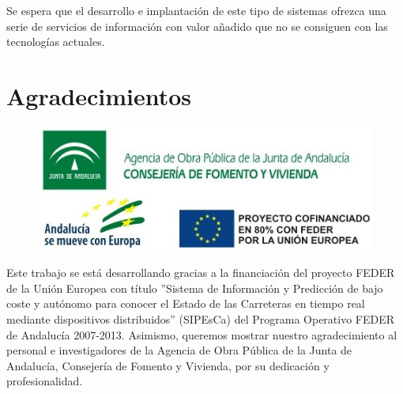 \documentclass[twocolumn,twoside]{Jornadas}
\begin{document}
Se espera que el desarrollo e implantación de este tipo de sistemas ofrezca una serie de servicios de información con valor añadido que no se consiguen con las tecnologías actuales.


\bigskip

\section*{Agradecimientos}

\begin{figure}[H]
\begin{center} 
 \includegraphics[scale=0.7]{logos_SIPESCA_2.jpg}
\end{center} 
\end{figure}

Este trabajo se está desarrollando gracias a la financiación del proyecto FEDER de la Unión Europea con título
{''Sistema de Información y Predicción de bajo coste y autónomo para conocer el Estado de las Carreteras en tiempo real mediante dispositivos distribuidos'' (SIPEsCa)}
del Programa Operativo FEDER de Andalucía 2007-2013. 
Asimismo, queremos mostrar nuestro agradecimiento al personal e investigadores de la Agencia de Obra Pública de la Junta de Andalucía, Consejería de Fomento y Vivienda, por su dedicación y profesionalidad.


\bigskip






\nocite{*}



 
\end{document}

